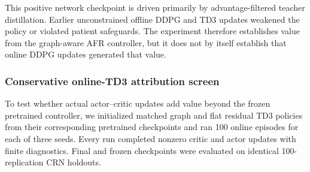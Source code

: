 \documentclass[preprint,review,12pt]{elsarticle}
\begin{document}
\begin{table}[htbp]
\centering
\caption{Cost decomposition for MDL-2 and Network AFR-GCN--DDPG in the abrupt-regional-shift holdout. The final column is the within-component percentage change. Components are grouped without changing the total-objective denominator used in Table~\ref{tab:regional_network_pairs}.}
\label{tab:regional_cost_decomposition}
\end{table}

This positive network checkpoint is driven primarily by advantage-filtered
teacher distillation. Earlier unconstrained offline DDPG and TD3 updates
weakened the policy or violated patient safeguards. The experiment therefore
establishes value from the graph-aware AFR controller, but it does not by
itself establish that online DDPG updates generated that value.

\subsubsection{Conservative online-TD3 attribution screen}

To test whether actual actor--critic updates add value beyond the frozen
pretrained controller, we initialized matched graph and flat residual TD3
policies from their corresponding pretrained checkpoints and ran 100 online
episodes for each of three seeds. Every run completed nonzero critic and actor
updates with finite diagnostics. Final and frozen checkpoints were evaluated
on identical 100-replication CRN holdouts.
\end{document}
